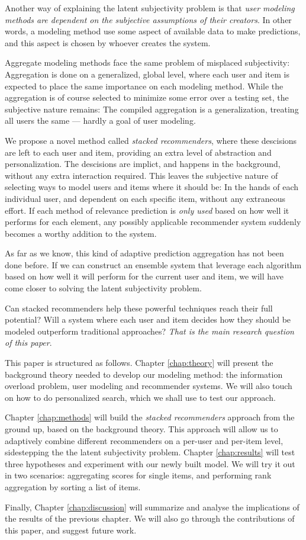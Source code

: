 Another way of explaining the latent subjectivity problem is that 
\emph{user modeling methods are dependent on the subjective assumptions of their creators}.
In other words, a modeling method use some aspect of available data to make predictions,
and this aspect is chosen by whoever creates the system.

Aggregate modeling methods face the same problem of misplaced subjectivity: 
Aggregation is done on a generalized, global level,
where each user and item is expected to place the same importance on each modeling method.
While the aggregation is of course selected to minimize some error over a testing set,
the subjective nature remains: The compiled aggregation is a generalization,
treating all users the same --- hardly a goal of user modeling.

We propose a novel method called \emph{stacked recommenders}, where these descisions are left to each user and item,
providing an extra level of abstraction and personalization.
The descisions are implict, and happens in the background, without any extra interaction required.
This leaves the subjective nature of selecting ways to model users and items where it should be:
In the hands of each individual user, and dependent on each specific item, without any extraneous effort.
If each method of relevance prediction is \emph{only used} based on how well it performs for each element,
any possibly applicable recommender system suddenly becomes a worthy addition to the system.

As far as we know, this kind of adaptive prediction aggregation has not been done before.
If we can construct an ensemble system that leverage each algorithm
based on how well it will perform for the current user and item,
we will have come closer to solving the latent subjectivity problem.

Can stacked recommenders help these powerful techniques reach their full potential?
Will a system where each user and item decides how they should be modeled outperform traditional approaches?
\emph{That is the main research question of this paper}.


\hr


This paper is structured as follows.
Chapter \ref{chap:theory} will present the background theory needed to develop our modeling method:
the information overload problem, user modeling and recommender systems. We will also touch on
how to do personalized search, which we shall use to test our approach.

Chapter \ref{chap:methods} will build the \emph{stacked recommenders} approach from the ground up,
based on the background theory.
This approach will allow us to adaptively combine different recommenders
on a per-user and per-item level, sidestepping the the latent subjectivity problem.
Chapter \ref{chap:results} will test three hypotheses and experiment with our newly built model.
We will try it out in two scenarios:
aggregating scores for single items, and performing rank aggregation by sorting a list of items.

Finally, Chapter \ref{chap:discussion} will summarize and analyse the implications of 
the results of the previous chapter.
We will also go through the contributions of this paper, and suggest future work.



